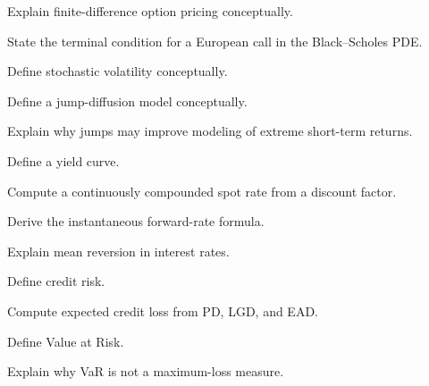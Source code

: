 \begin{exercise}[2]
Explain finite-difference option pricing conceptually.
\end{exercise}

\begin{exercise}[3]
State the terminal condition for a European call in the Black--Scholes PDE.
\end{exercise}

\begin{exercise}[2]
Define stochastic volatility conceptually.
\end{exercise}

\begin{exercise}[2]
Define a jump-diffusion model conceptually.
\end{exercise}

\begin{exercise}[3]
Explain why jumps may improve modeling of extreme short-term returns.
\end{exercise}

\begin{exercise}[2]
Define a yield curve.
\end{exercise}

\begin{exercise}[2]
Compute a continuously compounded spot rate from a discount factor.
\end{exercise}

\begin{exercise}[3]
Derive the instantaneous forward-rate formula.
\end{exercise}

\begin{exercise}[3]
Explain mean reversion in interest rates.
\end{exercise}

\begin{exercise}[2]
Define credit risk.
\end{exercise}

\begin{exercise}[2]
Compute expected credit loss from PD, LGD, and EAD.
\end{exercise}

\begin{exercise}[2]
Define Value at Risk.
\end{exercise}

\begin{exercise}[3]
Explain why VaR is not a maximum-loss measure.
\end{exercise}

